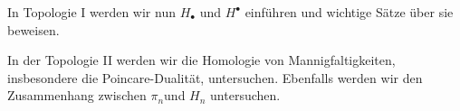 In Topologie I werden wir nun $H_{\bullet}$ und $H^{\bullet}$ einführen und wichtige Sätze über sie beweisen.

In der Topologie II  werden wir die Homologie von Mannigfaltigkeiten, insbesondere die Poincare-Dualität, untersuchen. Ebenfalls werden wir den Zusammenhang zwischen $\pi_n$und $H_n$ untersuchen.
